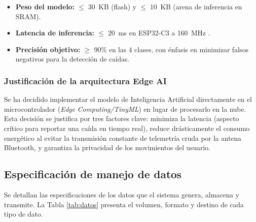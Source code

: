 \documentclass[letterpaper,11pt]{article}
\newcommand{\rtabla}[1]{Tabla \ref{#1}}
\begin{document}
\begin{itemize}
    \item \textbf{Peso del modelo:} $\leq$ 30~KB (flash) y $\leq$ 10~KB (arena de inferencia en SRAM).
    \item \textbf{Latencia de inferencia:} $\leq$ 20~ms en ESP32-C3 a 160~MHz \citep{esp32c3_ds}.
    \item \textbf{Precisión objetivo:} $\geq$ 90\% en las 4 clases, con énfasis en minimizar falsos negativos para la detección de caídas.
\end{itemize}

\subsubsection{Justificación de la arquitectura Edge AI}
Se ha decidido implementar el modelo de Inteligencia Artificial directamente en el microcontrolador (\textit{Edge Computing/TinyML}) en lugar de procesarlo en la nube. Esta decisión se justifica por tres factores clave: minimiza la latencia (aspecto crítico para reportar una caída en tiempo real), reduce drásticamente el consumo energético al evitar la transmisión constante de telemetría cruda por la antena Bluetooth, y garantiza la privacidad de los movimientos del usuario.

\subsection{Especificación de manejo de datos}

Se detallan las especificaciones de los datos que el sistema genera, almacena y transmite. La \rtabla{tab:datos} presenta el volumen, formato y destino de cada tipo de dato.
\end{document}
